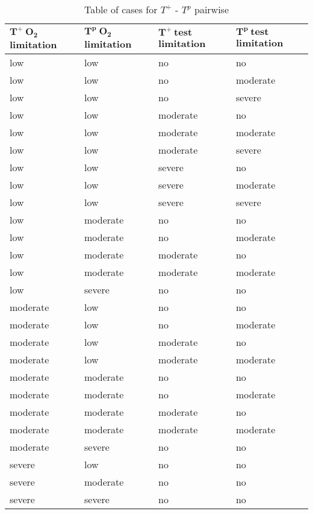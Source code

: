 \begin{table}
  \centering
  \begin{tabular}{|l|l|l|l|}
    \hline
    \textbf{$\boldsymbol{T^+\ O_2}$ limitation} & \textbf{$\boldsymbol{T^p\ O_2}$ limitation} & \textbf{$\boldsymbol{T^+\ test}$ limitation} & \textbf{$\boldsymbol{T^p\ test}$ limitation}  \\ \hline
    low & low & no & no \\ \hline
    low & low & no & moderate \\ \hline
    low & low & no & severe \\ \hline
    low & low & moderate & no \\ \hline
    low & low & moderate & moderate \\ \hline
    low & low & moderate & severe \\ \hline
    low & low & severe & no \\ \hline
    low & low & severe & moderate \\ \hline
    low & low & severe & severe \\ \hline
    low & moderate & no & no \\ \hline
    low & moderate & no & moderate \\ \hline
    low & moderate & moderate & no \\ \hline
    low & moderate & moderate & moderate \\ \hline
    low & severe & no & no \\ \hline
    moderate & low & no & no \\ \hline
    moderate & low & no & moderate \\ \hline
    moderate & low & moderate & no \\ \hline
    moderate & low & moderate & moderate \\ \hline
    moderate & moderate & no & no \\ \hline
    moderate & moderate & no & moderate \\ \hline
    moderate & moderate & moderate & no \\ \hline
    moderate & moderate & moderate & moderate \\ \hline
    moderate & severe & no & no \\ \hline
    severe & low & no & no \\ \hline
    severe & moderate & no & no \\ \hline
    severe & severe & no & no \\ \hline
  \end{tabular}
  \caption{Table of cases for $T^+$ - $T^p$ pairwise}
  \label{tab_Tpos-Tpro_cases}
\end{table}


